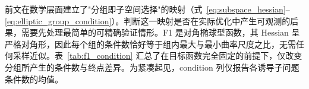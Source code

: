 前文在数学层面建立了"分组即子空间选择"的映射（式~\eqref{eq:subspace_hessian}--\eqref{eq:elliptic_group_condition}）。判断这一映射是否在实际优化中产生可观测的后果，需要先处理最简单的可精确验证情形。F1 是对角椭球型函数，其 Hessian 呈严格对角形，因此每个组的条件数恰好等于组内最大与最小曲率尺度之比，无需任何采样近似。表~\ref{tab:f1_condition} 汇总了在目标函数完全固定的前提下，仅改变分组所产生的条件数与终点差异。为紧凑起见，condition 列仅报告各诱导子问题条件数的均值。
